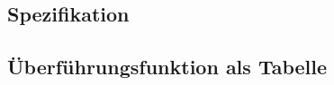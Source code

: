 

\subsection{Spezifikation}

\subsection{Überführungsfunktion als Tabelle}

\clearpage






\clearpage